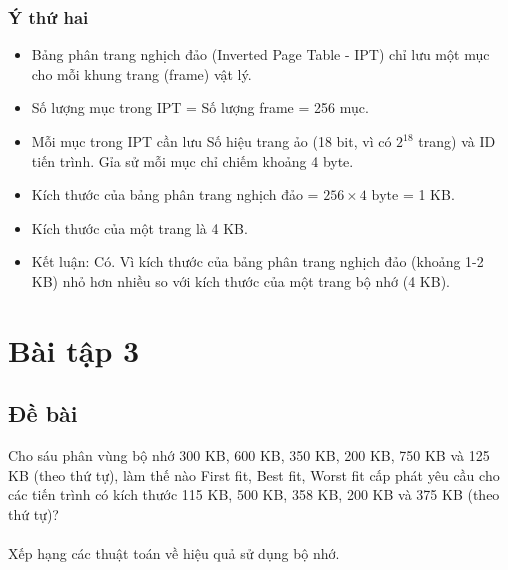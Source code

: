 \documentclass[12pt, letterpaper]{article}
\begin{document}
\subsubsection{Ý thứ hai}
\begin{itemize}
    \item Bảng phân trang nghịch đảo (Inverted Page Table - IPT) chỉ lưu một mục cho mỗi khung trang (frame) vật lý.
    \item Số lượng mục trong IPT = Số lượng frame = 256 mục.
    \item Mỗi mục trong IPT cần lưu Số hiệu trang ảo (18 bit, vì có $2^{18}$ trang) và ID tiến trình. Gỉa sử mỗi mục chỉ chiếm khoảng 4 byte.
    \item Kích thước của bảng phân trang nghịch đảo = $256 \times 4 \text{ byte}$ = 1 KB.
    \item Kích thước của một trang là 4 KB.
    \item Kết luận: Có. Vì kích thước của bảng phân trang nghịch đảo (khoảng 1-2 KB) nhỏ hơn nhiều so với kích thước của một trang bộ nhớ (4 KB).
\end{itemize}
\section{Bài tập 3}
\subsection{Đề bài}
Cho sáu phân vùng bộ nhớ 300 KB, 600 KB, 350 KB, 200 KB, 750 KB và 125 KB (theo thứ tự), làm thế nào First fit, Best fit, Worst fit cấp phát yêu cầu cho các tiến  trình có kích thước 115 KB, 500 KB, 358 KB, 200 KB và 375 KB (theo thứ tự)? \\\\

\noindent Xếp hạng các thuật toán về hiệu quả sử dụng bộ nhớ.
\end{document}
